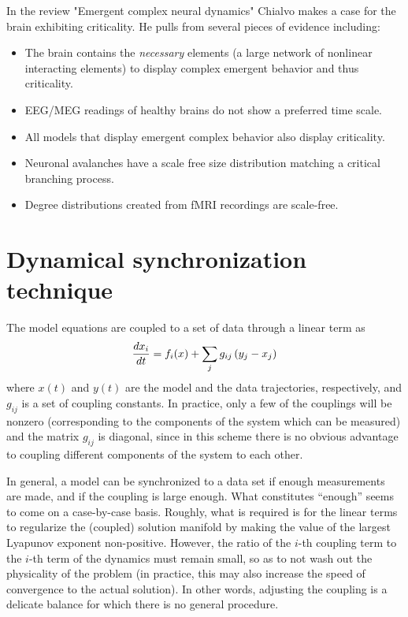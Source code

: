 \documentclass{article} %
\begin{document}
In the review  "Emergent complex neural dynamics\cite{chialvo}" Chialvo makes a case for the
brain exhibiting criticality.  He pulls from several pieces of evidence
including:
\begin{itemize}
\item The brain contains the \emph{necessary} elements (a large network of
nonlinear interacting elements) to display complex emergent behavior and thus
criticality.
\item EEG/MEG readings of healthy brains do not show a preferred time scale.
\item All models that display emergent complex behavior also display
criticality. 
\item Neuronal avalanches have a scale free size distribution matching a
critical branching process.
\item Degree distributions created from fMRI recordings are scale-free.
\end{itemize}


\section{Dynamical synchronization technique}
The model equations are coupled to a set of data through a linear term as
\begin{align}
	\frac{d x_i}{d t} = f_i(x) + \sum_{j} g_{ij} \left(y_j - x_j\right)
\end{align}
where $x(t)$ and $y(t)$ are the model and the data trajectories, respectively, and $g_{ij}$ is a set of coupling constants.  In practice, only a few of the couplings will be nonzero (corresponding to the components of the system which can be measured) and the matrix $g_{ij}$ is diagonal, since in this scheme there is no obvious advantage to coupling different components of the system to each other.

In general, a model can be synchronized to a data set if enough measurements are made, and if the coupling is large enough.  What constitutes ``enough'' seems to come on a case-by-case basis.  Roughly, what is required is for the linear terms to regularize the (coupled) solution manifold by making the value of the largest Lyapunov exponent non-positive.  However, the ratio of the $i$-th coupling term to the $i$-th term of the dynamics must remain small, so as to not wash out the physicality of the problem (in practice, this may also increase the speed of convergence to the actual solution).  In other words, adjusting the coupling is a delicate balance for which there is no general procedure.
\end{document}
